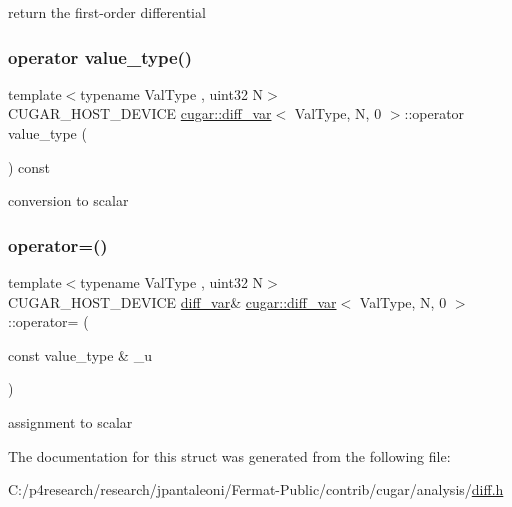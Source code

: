 return the first-\/order differential \mbox{\label{structcugar_1_1diff__var_3_01_val_type_00_01_n_00_010_01_4_a459196a06c30439af04cbc2777d82618}} 
\subsubsection{\texorpdfstring{operator value\+\_\+type()}{operator value\_type()}}
{\footnotesize\ttfamily template$<$typename Val\+Type , uint32 N$>$ \\
C\+U\+G\+A\+R\+\_\+\+H\+O\+S\+T\+\_\+\+D\+E\+V\+I\+CE \hyperlink{structcugar_1_1diff__var}{cugar\+::diff\+\_\+var}$<$ Val\+Type, N, 0 $>$\+::operator value\+\_\+type (\begin{DoxyParamCaption}{ }\end{DoxyParamCaption}) const\hspace{0.3cm}{\ttfamily [inline]}}

conversion to scalar \mbox{\label{structcugar_1_1diff__var_3_01_val_type_00_01_n_00_010_01_4_aed5199dc2a41d96e395e3dc1384afda5}} 
\subsubsection{\texorpdfstring{operator=()}{operator=()}}
{\footnotesize\ttfamily template$<$typename Val\+Type , uint32 N$>$ \\
C\+U\+G\+A\+R\+\_\+\+H\+O\+S\+T\+\_\+\+D\+E\+V\+I\+CE \hyperlink{structcugar_1_1diff__var}{diff\+\_\+var}\& \hyperlink{structcugar_1_1diff__var}{cugar\+::diff\+\_\+var}$<$ Val\+Type, N, 0 $>$\+::operator= (\begin{DoxyParamCaption}\item[{const value\+\_\+type \&}]{\+\_\+u }\end{DoxyParamCaption})\hspace{0.3cm}{\ttfamily [inline]}}

assignment to scalar 

The documentation for this struct was generated from the following file\+:\begin{DoxyCompactItemize}
\item 
C\+:/p4research/research/jpantaleoni/\+Fermat-\/\+Public/contrib/cugar/analysis/\hyperlink{diff_8h}{diff.\+h}\end{DoxyCompactItemize}
